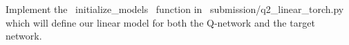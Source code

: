 \item {}
Implement the ~initialize_models~ function in ~submission/q2_linear_torch.py~ which will define our linear model for both the Q-network and the target network.